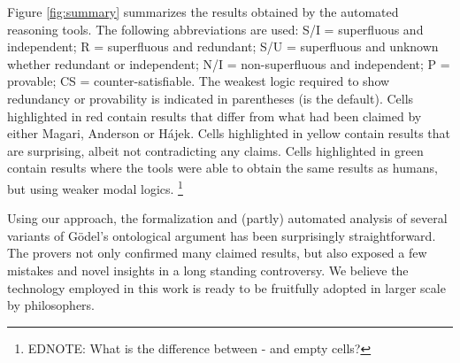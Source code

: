 \documentclass{birkjour}
\theoremstyle{definition}
\theoremstyle{remark}
\numberwithin{equation}{section}
\begin{document}
Figure \ref{fig:summary} summarizes the results obtained by the
automated reasoning tools. The following abbreviations are used: S/I =
superfluous and independent; R = superfluous and redundant; S/U =
superfluous and unknown whether redundant or independent; N/I =
non-superfluous and independent; P = provable; CS =
counter-satisfiable. The weakest logic required to show redundancy or
provability is indicated in parentheses (\K is the default).  Cells
highlighted in \colorbox{\tabred}{red} contain results that differ
from what had been claimed by either Magari, Anderson or Hájek. Cells
highlighted in \colorbox{\tabyellow}{yellow} contain results that are
surprising, albeit not contradicting any claims. Cells highlighted in
\colorbox{\tabgreen}{green} contain results where the tools were able
to obtain the same results as humans, but using weaker modal logics.
\footnote{EDNOTE: What is the difference between - and empty cells?}



Using our approach, the formalization and (partly) automated analysis
of several variants of G\"odel's ontological argument has been
surprisingly straightforward. The provers not only confirmed many
claimed results, but also exposed a few mistakes and novel insights
in a long standing controversy.
We believe the technology employed in
this work is ready to be fruitfully adopted in larger scale by
philosophers.







\sloppy
\printbibliography



\end{document}
